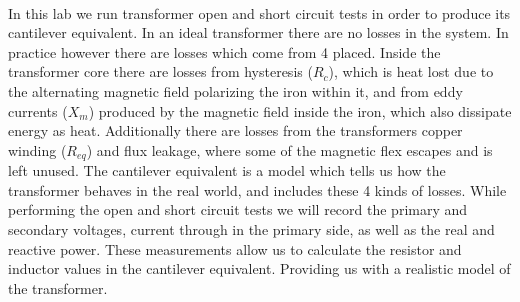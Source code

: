 \paragraph{}In this lab we run transformer open and short circuit tests in order to
produce its cantilever equivalent. In an ideal transformer there are no losses in
the system. In practice however there are losses which come from 4 placed. Inside the
transformer core there are losses from hysteresis ($R_c$), which is heat lost due to the
alternating magnetic field polarizing the iron within it, and from eddy currents ($X_m$)
produced by the magnetic field inside the iron, which also dissipate energy as heat.
Additionally there are losses from the transformers copper winding ($R_{eq}$) and
flux leakage, where some of the magnetic flex escapes and is left unused. The cantilever
equivalent is a model which tells us how the transformer behaves in the real world, and
includes these 4 kinds of losses. While performing the open and short circuit tests we
will record the primary and secondary voltages, current through in the primary side,
as well as the real and reactive power. These measurements allow us to calculate the
resistor and inductor values in the cantilever equivalent. Providing us with a realistic
model of the transformer.
